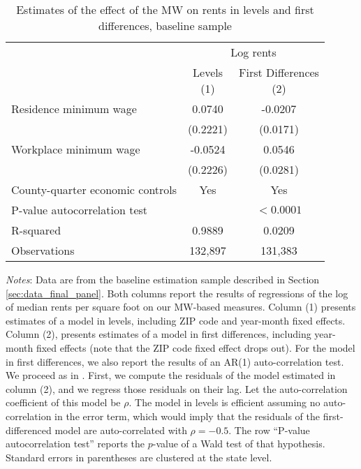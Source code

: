 \begin{table}[hbt!] \centering
    \caption{Estimates of the effect of the MW on rents in levels and first differences,
             baseline sample}
    \label{tab:autocorrelation}
    \begin{tabular}{@{}lcc@{}}
        \toprule
            & \multicolumn{2}{c}{Log rents}                             \\ \cmidrule(l){2-3} 
            & \shortstack{Levels\\(1)} 
            & \shortstack{First Differences\\(2)}                       \\ \midrule
        Residence minimum wage             &  0.0740   &  -0.0207              \\
                                           & (0.2221)  & (0.0171)             \\
        Workplace minimum wage             &  -0.0524   &  0.0546              \\
                                           & (0.2226)  & (0.0281)             \\ \midrule
        County-quarter economic controls   &  Yes   &  Yes              \\
        P-value autocorrelation test       &        &  $<0.0001$        \\
        R-squared                          &  0.9889   &  0.0209              \\
        Observations                       &  132,897  &  131,383             \\ \bottomrule
    \end{tabular}

    \begin{minipage}{.95\textwidth} \footnotesize
        \vspace{2mm}
        \textit{Notes}: 
        Data are from the baseline estimation sample described in Section 
        \ref{sec:data_final_panel}.
        Both columns report the results of regressions of the log of 
        median rents per square foot on our MW-based measures.
        Column (1) presents estimates of a model in levels, including 
        ZIP code and year-month fixed effects.
        Column (2), presents estimates of a model in first differences, 
        including year-month fixed effects 
        (note that the ZIP code fixed effect drops out).
        For the model in first differences, we also report the results of an 
        AR(1) auto-correlation test.
        We proceed as in \parencite[][Section 10.6.3]{wooldridge2010}.
        First, we compute the residuals of the model estimated in column (2), 
        and we regress those residuals on their lag.
        Let the auto-correlation coefficient of this model be $\rho$.
        The model in levels is efficient assuming no auto-correlation in the 
        error term, which would imply that the residuals of the 
        first-differenced model are auto-correlated with $\rho = -0.5$.
        The row ``P-value autocorrelation test'' reports the $p$-value of 
        a Wald test of that hypothesis.
        Standard errors in parentheses are clustered at the state level.
    \end{minipage}
\end{table}
